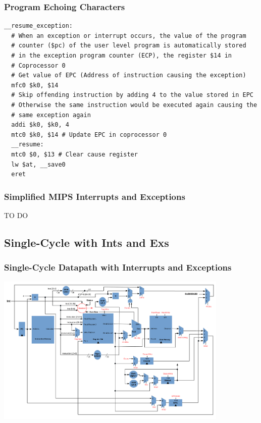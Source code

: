 \documentclass{beamer}
\begin{document}
\begin{frame}[fragile]
\frametitle{Program Echoing Characters}

\scriptsize

\begin{lstlisting}[firstnumber=53]
__resume_exception:
  # When an exception or interrupt occurs, the value of the program
  # counter ($pc) of the user level program is automatically stored
  # in the exception program counter (ECP), the register $14 in
  # Coprocessor 0
  # Get value of EPC (Address of instruction causing the exception)
  mfc0 $k0, $14
  # Skip offending instruction by adding 4 to the value stored in EPC
  # Otherwise the same instruction would be executed again causing the
  # same exception again
  addi $k0, $k0, 4
  mtc0 $k0, $14 # Update EPC in coprocessor 0
  __resume:
  mtc0 $0, $13 # Clear cause register
  lw $at, __save0
  eret
\end{lstlisting}

\end{frame}

\begin{frame}%
\frametitle{Simplified MIPS Interrupts and Exceptions}

TO DO

\end{frame}

\subsection{Single-Cycle with Ints and Exs}

\begin{frame}%
\frametitle{Single-Cycle Datapath with Interrupts and Exceptions}

\begin{center}
\vspace*{-0.2cm}
\hspace*{-1cm}\includegraphics[width=11.1cm]{complete_single_cycle_int.pdf}
\end{center}

\end{frame}
\end{document}
